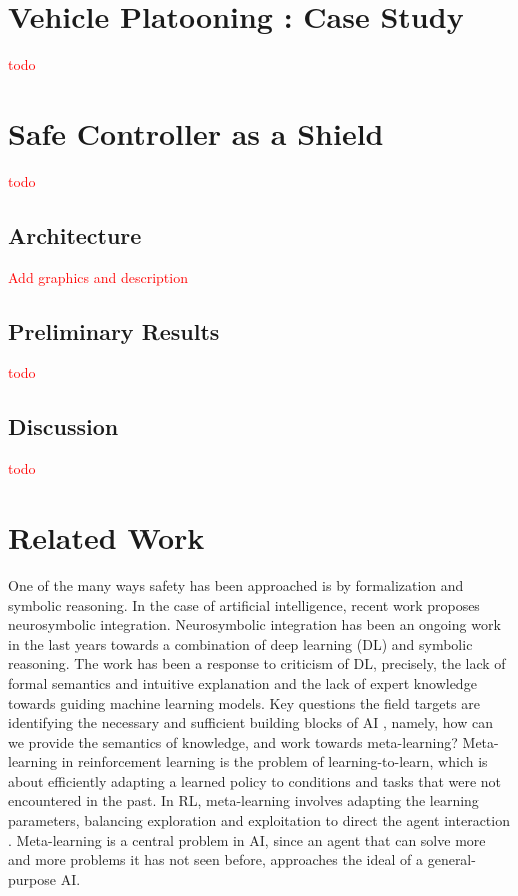 \documentclass[a4paper,11pt]{article}
\begin{document}
\section{Vehicle Platooning : Case Study}
\textcolor{red}{todo}

\section{Safe Controller as a Shield} 
\textcolor{red}{todo}
\subsection{Architecture}
\textcolor{red}{Add graphics and description}
\subsection{Preliminary Results}
\textcolor{red}{todo}
\subsection{Discussion}
\textcolor{red}{todo}

\section{Related Work}
One of the many ways safety has been approached is by formalization and symbolic reasoning. 
In the case of artificial intelligence, recent work proposes neurosymbolic integration. 
Neurosymbolic integration has been an ongoing work in the last years towards a combination of deep learning (DL) and symbolic reasoning.
The work has been a response to criticism of DL, precisely, the lack of formal semantics and intuitive explanation and the lack of expert knowledge towards guiding machine learning models. 
Key questions the field targets are identifying the necessary and sufficient building blocks of AI \cite{garcez2020neurosymbolic}, namely, how can we provide the semantics of knowledge, 
and work towards meta-learning? Meta-learning in reinforcement learning is the problem of learning-to-learn, which is about efficiently
adapting a learned policy to conditions and tasks that were not encountered in the past. In RL, meta-learning
involves adapting the learning parameters, balancing exploration and exploitation to direct the
agent interaction \cite{gupta_meta-reinforcement_2018,schweighofer_meta-learning_2003}. Meta-learning is a central problem in AI, since an agent that can solve more
and more problems it has not seen before, approaches the ideal of a general-purpose AI. 
\end{document}
